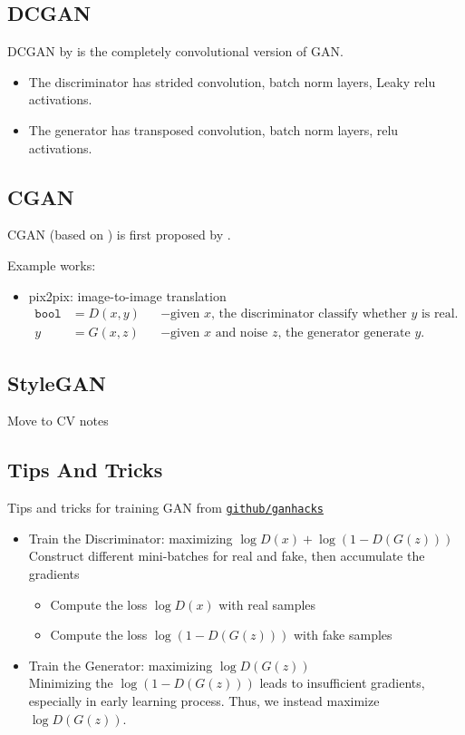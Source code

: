 \subsection{DCGAN}
\ac{DCGAN} by  is the completely convolutional version of \ac{GAN}.
\begin{itemize}
	\item The discriminator has strided convolution, batch norm layers, Leaky \ac{relu} activations.
	\item The generator has transposed convolution, batch norm layers, \ac{relu} activations.
\end{itemize}

\todo{}

\subsection{CGAN}
\ac{CGAN} (based on ) is first proposed by .

Example works:
\begin{itemize}
	\item pix2pix: image-to-image translation \cite{isola2017image}
	\begin{align}
		\texttt{bool} &= D(x,y) &&-\text{given $x$, the discriminator classify whether $y$ is real.}\\
		y &= G(x,z) &&-\text{given $x$ and noise $z$, the generator generate $y$.}
	\end{align}
\end{itemize}

\subsection{StyleGAN}
\note Move to \ac{CV} notes

\subsection{Tips And Tricks}
Tips and tricks for training \ac{GAN} from \href{https://github.com/soumith/ganhacks}{\texttt{github/ganhacks}}
\begin{itemize}
	\item Train the Discriminator: maximizing $\log D(x) + \log (1-D(G(z)))$\\
	Construct different mini-batches for real and fake, then accumulate the gradients
	\begin{itemize}
		\item Compute the loss $\log D(x)$ with real samples
		\item Compute the loss $\log (1 - D(G(z)))$ with fake samples
	\end{itemize}
	\item Train the Generator: maximizing $\log D (G(z))$\\
	Minimizing the $\log(1 - D(G(z)))$ leads to insufficient gradients, especially in early learning process. Thus, we instead maximize $\log D (G(z))$.
\end{itemize}

